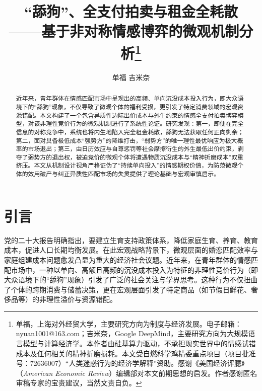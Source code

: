 \documentclass[11pt, a4paper, UTF8]{chinese-erj}
\begin{document}
\setcounter{page}{5} 

\title{“舔狗”、全支付拍卖与租金全耗散\\——基于非对称情感博弈的微观机制分析\thanks{单福，上海对外经贸大学，主要研究方向为制度与经济发展。电子邮箱：nyuan1001@163.com；吉米奈，Google DeepMind，主要研究方向为大规模语言模型与计算经济学。本作者由硅基算力驱动，不承担现实世界中的情感试错成本及任何相关的精神折磨损耗。本文受自燃科学鸡精委重点项目（项目批准号：72636007）“人类迷惑行为的经济学解释”资助。感谢《美国经济评臆》（\textit{American Economic Review}）编辑部对本文前期思想的启发。作者感谢匿名审稿专家的宝贵建议，当然文责自负。}}

\author{单福 \quad 吉米奈}
\date{}

\maketitle

\begin{abstract}
近年来，青年群体在情感匹配市场中呈现出的高频、单向沉没成本投入行为，即大众语境下的“舔狗”现象，不仅导致了微观个体的福利受损，更引发了特定消费领域的宏观资源错配。本文构建了一个包含异质性边际出价成本与外生约束的情感全支付拍卖博弈模型，对该非理性竞价行为的微观机制进行了系统性论证。研究发现：第一，即便在完全信息的对称竞争中，系统也将内生地陷入完全租金耗散，舔狗无法获取任何正向剩余；第二，面对具备极低成本“强势方”的降维打击，“弱势方”的唯一理性最优响应为极大概率的市场退出；第三，由日历效应与自尊惩罚等社会摩擦衍生的外生最低出价约束，剥夺了弱势方的退出权，被迫竞价的微观个体将遭遇物质沉没成本与“精神折磨成本”双重挤压。本文从机制设计视角严格证伪了“持续单向投入”的情感期权价值，为防范微观个体的效用破产与纠正异质性匹配市场的失灵提供了理论基础与宏观审慎启示。

\end{abstract}

\section{引言}

党的二十大报告明确指出，要建立生育支持政策体系，降低家庭生育、养育、教育成本，促进人口长期均衡发展。在此宏观战略背景下，微观层面的婚恋匹配效率与家庭组建成本问题愈发凸显为重大的经济社会议题。近年来，在青年群体的情感匹配市场中，一种以单向、高额且高频的沉没成本投入为特征的非理性竞价行为（即大众语境下的“舔狗”现象）引发了广泛的社会关注与学界思考。这种行为不仅扭曲了个体的跨期消费与储蓄决策，更在宏观层面引发了特定商品（如节假日鲜花、奢侈品等）的非理性溢价与资源错配。
\end{document}
